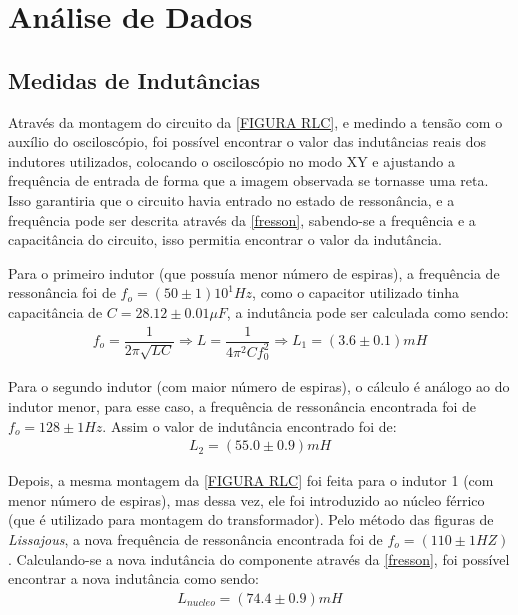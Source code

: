 \documentclass[11pt,a4paper]{article}
\begin{document}
\section{Análise de Dados}
    
    \subsection{Medidas de Indutâncias}
    Através da montagem do circuito da \cref{FIGURA RLC}, e medindo a tensão com o auxílio do osciloscópio, foi possível encontrar o valor das indutâncias reais dos indutores utilizados, colocando o osciloscópio no modo XY e ajustando a frequência de entrada de forma que a imagem observada se tornasse uma reta. Isso garantiria que o circuito havia entrado no estado de ressonância, e a frequência pode ser descrita através da \cref{fresson}, sabendo-se a frequência e a capacitância do circuito, isso permitia encontrar o valor da indutância.
    
    Para o primeiro indutor (que possuía menor número de espiras), a frequência de ressonância foi de $f_o = (50 \pm 1)10^{1}Hz$, como o capacitor utilizado tinha capacitância de $C= 28.12 \pm 0.01 \mu F$, a indutância pode ser calculada como sendo:
    \begin{gather*}
    f_{o}= \dfrac{1}{2 \pi \sqrt{LC}} \Rightarrow L= \dfrac{1}{4 \pi ^2 C f_0 ^2} \Rightarrow L_1= (3.6 \pm 0.1)mH
    \end{gather*}
    
    Para o segundo indutor (com maior número de espiras), o cálculo é análogo ao do indutor menor, para esse caso, a frequência de ressonância encontrada foi de $f_o = 128 \pm 1 Hz$. Assim o valor de indutância encontrado foi de:
    \begin{gather*}
    L_2=(55.0 \pm 0.9)mH
    \end{gather*}
    
    Depois, a mesma montagem da \cref{FIGURA RLC} foi feita para o indutor 1 (com menor número de espiras), mas dessa vez, ele foi introduzido ao núcleo férrico (que é utilizado para montagem do transformador). Pelo método das figuras de \textit{Lissajous}, a nova frequência de ressonância encontrada foi de $f_o=(110 \pm 1 HZ)$. Calculando-se a nova indutância do componente através da \cref{fresson}, foi possível encontrar a nova indutância como sendo:
    \begin{gather*}
        L_{nucleo}=(74.4 \pm 0.9)mH
    \end{gather*}
    
\end{document}
